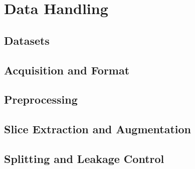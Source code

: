 \section{Data Handling}
\label{sec:data-handling}


\subsection{Datasets}
\label{sec:datasets}

\subsection{Acquisition and Format}
\label{sec:acquisition}

\subsection{Preprocessing}
\label{sec:preprocessing}

\subsection{Slice Extraction and Augmentation}
\label{sec:slices-augmentation}

\subsection{Splitting and Leakage Control}
\label{sec:splitting}

